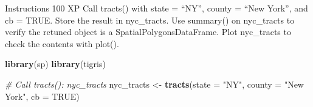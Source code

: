 \documentclass[]{article}
\newenvironment{Shaded}{\begin{snugshade}}{\end{snugshade}}
\newcommand{\CommentTok}[1]{\textcolor[rgb]{0.56,0.35,0.01}{\textit{#1}}}
\newcommand{\DataTypeTok}[1]{\textcolor[rgb]{0.13,0.29,0.53}{#1}}
\newcommand{\KeywordTok}[1]{\textcolor[rgb]{0.13,0.29,0.53}{\textbf{#1}}}
\newcommand{\NormalTok}[1]{#1}
\newcommand{\OtherTok}[1]{\textcolor[rgb]{0.56,0.35,0.01}{#1}}
\newcommand{\StringTok}[1]{\textcolor[rgb]{0.31,0.60,0.02}{#1}}
\begin{document}
Instructions 100 XP Call tracts() with state = ``NY'', county = ``New
York'', and cb = TRUE. Store the result in nyc\_tracts. Use summary() on
nyc\_tracts to verify the retuned object is a SpatialPolygonsDataFrame.
Plot nyc\_tracts to check the contents with plot().

\begin{Shaded}
\begin{Highlighting}[]
\KeywordTok{library}\NormalTok{(sp)}
\KeywordTok{library}\NormalTok{(tigris)}

\CommentTok{# Call tracts(): nyc_tracts}
\NormalTok{nyc_tracts <-}\StringTok{ }\KeywordTok{tracts}\NormalTok{(}\DataTypeTok{state =} \StringTok{"NY"}\NormalTok{, }\DataTypeTok{county =} \StringTok{"New York"}\NormalTok{, }\DataTypeTok{cb =} \OtherTok{TRUE}\NormalTok{)}
\end{Highlighting}
\end{Shaded}
\end{document}
